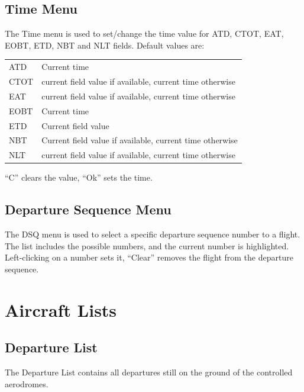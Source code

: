 \documentclass[a4paper,oneside,11pt]{memoir}
\begin{document}
\subsection{Time Menu}
\label{menu:tm}

The Time menu is used to set/change the time value for ATD, CTOT, EAT, EOBT, ETD, NBT and NLT fields.
Default values are:

\begin{longtable}{p{5cm} p{7.5cm}}
ATD     & Current time\\
CTOT    & current field value if available, current time otherwise\\
EAT     & current field value if available, current time otherwise\\
EOBT    & Current time\\
ETD     & Current field value\\
NBT     & Current field value if available, current time otherwise\\
NLT     & current field value if available, current time otherwise\\
\end{longtable}

“C” clears the value, “Ok” sets the time.

\subsection{Departure Sequence Menu}
\label{menu:dqm}

The DSQ menu is used to select a specific departure sequence number to a flight. The list includes the possible numbers, and the current number is highlighted. Left-clicking on a number sets it, “Clear” removes the flight from the departure sequence.


\section{Aircraft Lists}

\subsection{Departure List}\label{list:dep}

The Departure List contains all departures still on the ground of the controlled aerodromes.
\end{document}
